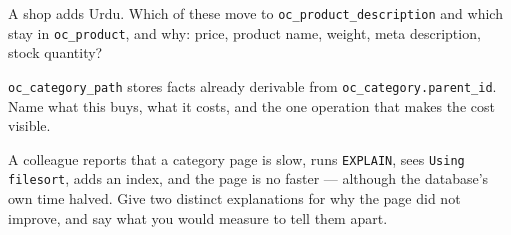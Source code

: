 \begin{checkpoint}
\begin{tightnum}
  \item A shop adds Urdu. Which of these move to
        \texttt{oc\_product\_description} and which stay in
        \texttt{oc\_product}, and why: price, product name, weight, meta
        description, stock quantity?
  \item \texttt{oc\_category\_path} stores facts already derivable from
        \texttt{oc\_category.parent\_id}. Name what this buys, what it costs,
        and the one operation that makes the cost visible.
  \item A colleague reports that a category page is slow, runs
        \texttt{EXPLAIN}, sees \texttt{Using filesort}, adds an index, and the
        page is no faster --- although the database's own time halved. Give two
        distinct explanations for why the page did not improve, and say what you
        would measure to tell them apart.
\end{tightnum}
\end{checkpoint}

